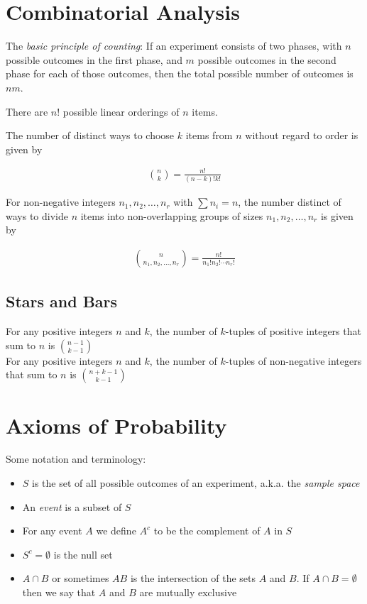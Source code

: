 \documentclass[10pt]{article}
\theoremstyle{definition}
\theoremstyle{theorem}
\begin{document}
		
		\section{Combinatorial Analysis}
		
		The \emph{basic principle of counting}: If an experiment consists of two phases, with $n$ possible outcomes in the first phase, and $m$ possible outcomes in the second phase for each of those outcomes, then the total possible number of outcomes is $nm$.
		
		There are $n!$ possible linear orderings of $n$ items.
		
		The number of distinct ways to choose $k$ items from $n$ without regard to order is given by
		
		\begin{align*}
			{n \choose k} = \frac{n!}{(n-k)!k!}
		\end{align*}
		
		For non-negative integers $n_1,n_2,\ldots, n_r$ with $\sum n_i = n$, the number distinct of ways to divide $n$ items into non-overlapping groups of sizes $n_1, n_2,\ldots, n_r$ is given by
		
		\begin{align*}
			{n \choose {n_1, n_2,\ldots, n_r}} = \frac{n!}{n_1!n_2! \cdots n_r!}
		\end{align*}
		
		\subsection*{Stars and Bars}
		For any positive integers $n$ and $k$, the number of $k$-tuples of positive integers that sum to $n$ is ${{n-1}\choose {k-1}}$\\
		For any positive integers $n$ and $k$, the number of $k$-tuples of non-negative integers that sum to $n$ is ${{n+k-1}\choose {k-1}}$
		\section{Axioms of Probability}
		
		Some notation and terminology:
		
		\begin{itemize}
			\item $S$ is the set of all possible outcomes of an experiment, a.k.a. the \emph{sample space}
			\item An \emph{event} is a subset of $S$
			\item For any event $A$ we define $A^c$ to be the complement of $A$ in $S$
			\item $S^c=\emptyset$ is the null set
			\item $A\cap B$ or sometimes $AB$ is the intersection of the sets $A$ and $B$. If $A\cap B = \emptyset$ then we say that $A$ and $B$ are mutually exclusive
		\end{itemize}
		
\end{document}
